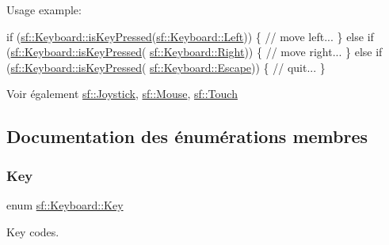 Usage example\+: 
\begin{DoxyCode}
\textcolor{keywordflow}{if} (\hyperlink{classsf_1_1Keyboard_a80a04b2f53005886957f49eee3531599}{sf::Keyboard::isKeyPressed}(\hyperlink{classsf_1_1Keyboard_acb4cacd7cc5802dec45724cf3314a142ac3fe5df11d15b57317c053a2ae13d9a9}{sf::Keyboard::Left}))
\{
    \textcolor{comment}{// move left...}
\}
\textcolor{keywordflow}{else} \textcolor{keywordflow}{if} (\hyperlink{classsf_1_1Keyboard_a80a04b2f53005886957f49eee3531599}{sf::Keyboard::isKeyPressed}(
      \hyperlink{classsf_1_1Keyboard_acb4cacd7cc5802dec45724cf3314a142a2aeb083dea103a8e36b6850b51ef3632}{sf::Keyboard::Right}))
\{
    \textcolor{comment}{// move right...}
\}
\textcolor{keywordflow}{else} \textcolor{keywordflow}{if} (\hyperlink{classsf_1_1Keyboard_a80a04b2f53005886957f49eee3531599}{sf::Keyboard::isKeyPressed}(
      \hyperlink{classsf_1_1Keyboard_acb4cacd7cc5802dec45724cf3314a142a64b7ecb543c5d03bec8383dde123c95d}{sf::Keyboard::Escape}))
\{
    \textcolor{comment}{// quit...}
\}
\end{DoxyCode}


\begin{DoxySeeAlso}{Voir également}
\hyperlink{classsf_1_1Joystick}{sf\+::\+Joystick}, \hyperlink{classsf_1_1Mouse}{sf\+::\+Mouse}, \hyperlink{classsf_1_1Touch}{sf\+::\+Touch} 
\end{DoxySeeAlso}


\subsection{Documentation des énumérations membres}
\mbox{\label{classsf_1_1Keyboard_acb4cacd7cc5802dec45724cf3314a142}} 
\subsubsection{\texorpdfstring{Key}{Key}}
{\footnotesize\ttfamily enum \hyperlink{classsf_1_1Keyboard_acb4cacd7cc5802dec45724cf3314a142}{sf\+::\+Keyboard\+::\+Key}}



Key codes. 

